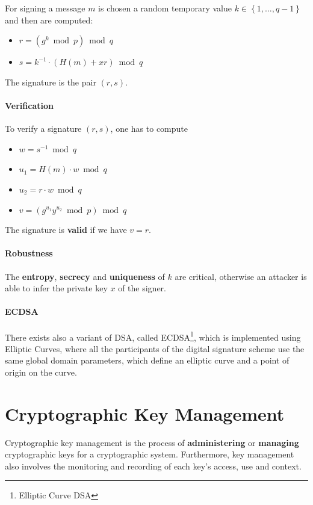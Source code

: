 \documentclass[oneside]{academica}
\begin{document}
For signing a message $m$ is chosen a random temporary value $k \in \left\{ 1, \ldots, q-1 \right\}$ and then are computed:
\begin{itemize}
  \item $r = (g^k \bmod p) \bmod q$
  \item $s = k^{-1} \cdot \left( H(m) + xr \right) \bmod q$
\end{itemize}
The signature is the pair $\left( r,s \right)$.

\subsubsection{Verification}

To verify a signature $\left( r,s \right)$, one has to compute
\begin{itemize}
  \item $w = s^{-1} \bmod q$
  \item $u_1 = H(m) \cdot w \bmod q$
  \item $u_2 = r \cdot w \bmod q$
  \item $v = \left( g^{u_1}y^{u_2} \bmod p \right) \bmod q$
\end{itemize}
The signature is \textbf{valid} if we have $v = r$.

\subsubsection{Robustness}

The \textbf{entropy}, \textbf{secrecy} and \textbf{uniqueness} of $k$ are critical, otherwise an attacker is able to infer the private key $x$ of the signer.

\subsubsection{ECDSA}

There exists also a variant of DSA, called ECDSA\footnote{Elliptic Curve DSA}, which is implemented using Elliptic Curves, where all the participants of the digital signature scheme use the same global domain parameters, which define an elliptic curve and a point of origin on the curve.

\chapter{Cryptographic Key Management}

Cryptographic key management is the process of \textbf{administering} or \textbf{managing} cryptographic keys for a cryptographic system.
Furthermore, key management also involves the monitoring and recording of each key’s access, use and context.
\end{document}
